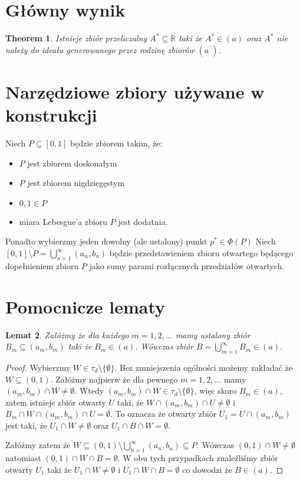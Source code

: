 \documentclass[12pt]{amsart}
\theoremstyle{plain}
\newtheorem{theorem}{Theorem}[section]
\newtheorem{lemma}[theorem]{Lemat}
\theoremstyle{definition}
\theoremstyle{remark}
\newcommand{\real}{\mathbb{R}}
\newcommand{\aideal}{\mathit{(a)}}
\newcommand{\aidealprime}{\mathit{(a^\prime)}}
\begin{document}
\section{Główny wynik}
\begin{theorem}
  Istnieje zbiór przeliczalny $A^* \subseteq \real$ taki że
$A^* \in \aideal$ oraz $A^*$ nie należy do ideału
generowanego przez rodzinę zbiorów $\aidealprime$.
\end{theorem}

\section{Narzędziowe zbiory używane w konstrukcji}

Niech $P \subseteq [0,1]$ będzie zbiorem takim, że:
\begin{itemize}
\item
  $P$ jest zbiorem doskonałym
\item
  $P$ jest zbiorem nigdziegęstym
\item
  $0, 1 \in P$
\item
  miara Lebesgue'a zbioru $P$ jest dodatnia.
\end{itemize}

Ponadto wybierzmy jeden dowolny (ale ustalony) punkt $p^* \in \Phi(P)$
Niech $[0, 1] \setminus P = \bigcup_{n=1}^\infty (a_n, b_n)$ będzie
przedstawieniem zbioru otwartego będącego dopełnieniem zbioru $P$
jako sumy parami rozłącznych przedziałów otwartych.

\section{Pomocnicze lematy}

\begin{lemma}
\label{lemat-o-sumie}
Załóżmy że dla każdego $m = 1,2,\ldots$ mamy ustalony zbiór
$B_m \subseteq (a_m, b_m)$ taki że $B_m \in \aideal$.
Wówczas zbiór $B = \bigcup_{m=1}^{\infty} B_m \in \aideal$.
\end{lemma}

\begin{proof}
Wybierzmy $W \in \tau_d \setminus \lbrace \emptyset \rbrace$.
Bez zmniejszenia ogólności możemy zakładać że 
$W \subseteq (0, 1)$. Załóżmy najpierw że dla pewnego 
$m = 1,2,\ldots$ mamy $(a_m, b_m) \cap W \not= \emptyset$.
Wtedy $(a_m, b_m) \cap W \in \tau_d \setminus \lbrace \emptyset \rbrace$,
więc skoro $B_m \in \aideal$, zatem istnieje zbiór otwarty $U$ 
taki, że $W \cap (a_m, b_m) \cap U \not=\emptyset$
i $B_m \cap W \cap (a_m, b_m) \cap U = \emptyset$. To oznacza że
otwarty zbiór $U_1 = U \cap (a_m, b_m)$ jest taki, że $U_1 \cap W \not=\emptyset$
oraz $U_1 \cap B \cap W = \emptyset$.

Załóżmy zatem że $W \subseteq (0,1) \setminus \bigcup_{n=1}^\infty (a_n, b_n) \subseteq P$.
Wówczas $(0,1) \cap W \not= \emptyset$
natomiast  $(0,1) \cap W \cap B = \emptyset$.
W obu tych przypadkach znaleźliśmy zbiór otwarty $U_1$ taki że
$U_1 \cap W \not=\emptyset$ i $U_1 \cap W \cap B = \emptyset$
co dowodzi że $B \in \aideal$.
\end{proof}
\end{document}
